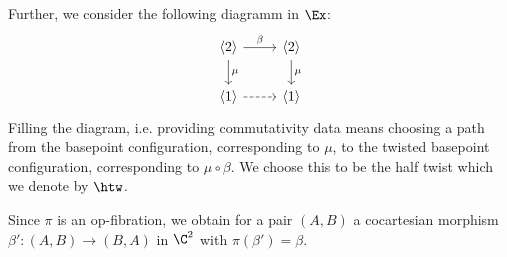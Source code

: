 Further, we consider the following diagramm in $\Ex$:
\[    
    \begin{tikzcd}
        \langle 2 \rangle \arrow[r, "\beta"] \arrow[d, "\mu"] & \langle 2 \rangle \arrow[d, "\mu"] \\
        \langle 1 \rangle  \arrow[r, dashed]                  & \langle 1 \rangle                
    \end{tikzcd}
\]
Filling the diagram, i.e. providing commutativity data means choosing a path 
from the basepoint configuration, corresponding to $\mu$, 
to the twisted basepoint configuration, corresponding to $\mu \circ \beta$. 
We choose this to be the half twist which we denote by $\htw$.

\begin{center}
\end{center}

Since $\pi$ is an op-fibration, we obtain for a pair $(A,B)$ a cocartesian morphism 
$\beta' \colon (A,B) \to (B,A)$ in $\C^2$ with $\pi(\beta')=\beta$.


